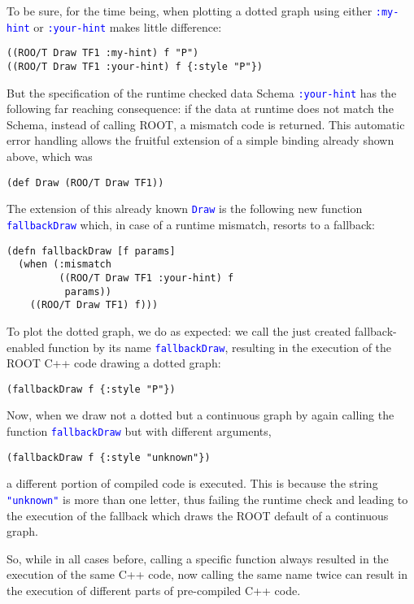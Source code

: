 \documentclass[twocolumn]{article}
\begin{document}
To be sure, for the time being, when plotting a dotted graph using either \texttt{\textcolor{blue}{:my-hint}} or \texttt{\textcolor{blue}{:your-hint}} makes little difference:
{\color{blue}\begin{verbatim}
((ROO/T Draw TF1 :my-hint) f "P")
((ROO/T Draw TF1 :your-hint) f {:style "P"})
\end{verbatim}}
But the specification of the runtime checked data Schema \texttt{\textcolor{blue}{:your-hint}} has the following far reaching consequence: if the data at runtime does not match the Schema, instead of calling ROOT, a mismatch code is returned. This automatic error handling allows the fruitful extension of a simple binding already shown above, which was
{\color{blue}\begin{verbatim}
(def Draw (ROO/T Draw TF1))
\end{verbatim}}
The extension of this already known \texttt{\textcolor{blue}{Draw}} is the following new function \texttt{\textcolor{blue}{fallbackDraw}} which, in case of a runtime mismatch, resorts to a fallback:
{\color{blue}\begin{verbatim}
(defn fallbackDraw [f params]
  (when (:mismatch
         ((ROO/T Draw TF1 :your-hint) f
          params))
    ((ROO/T Draw TF1) f)))
\end{verbatim}}
To plot the dotted graph, we do as expected: we call the just created fallback-enabled function by its name \texttt{\textcolor{blue}{fallbackDraw}}, resulting in the execution of the ROOT C++ code drawing a dotted graph:
{\color{blue}\begin{verbatim}
(fallbackDraw f {:style "P"})
\end{verbatim}}
Now, when we draw not a dotted but a continuous graph by again calling the function \texttt{\textcolor{blue}{fallbackDraw}} but with different arguments,
{\color{blue}\begin{verbatim}
(fallbackDraw f {:style "unknown"})
\end{verbatim}}
a different portion of compiled code is executed. This is because the string \texttt{\textcolor{blue}{"unknown"}} is more than one letter, thus failing the runtime check and leading to the execution of the fallback which draws the ROOT default of a continuous graph.

So, while in all cases before, calling a specific function always resulted in the execution of the same C++ code, now calling the same name twice can result in the execution of different parts of pre-compiled C++ code.
\end{document}
